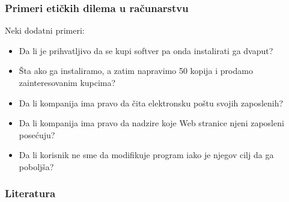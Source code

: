 \documentclass[pdf]{beamer}
\begin{document}
\begin{frame}
\frametitle{Primeri etičkih dilema u računarstvu}
	Neki dodatni primeri:
	\begin{itemize}
	\item Da li je prihvatljivo da se kupi softver pa onda instalirati ga dvaput?
	\item Šta ako ga instaliramo, a zatim napravimo 50 kopija i prodamo zainteresovanim kupcima?
	\item Da li kompanija ima pravo da čita elektronsku poštu svojih zaposlenih?
	\item Da li kompanija ima pravo da nadzire koje Web stranice njeni zaposleni posećuju?
	\item Da li korisnik ne sme da modifikuje program iako je njegov cilj da ga poboljša?
	\end{itemize}
\end{frame}

\begin{frame}
\frametitle{Literatura}
	
\appendix



\appendix

\end{frame}
\end{document}

